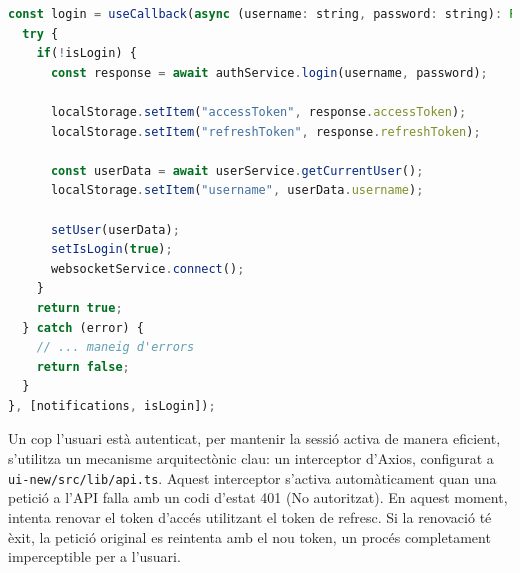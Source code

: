 \begin{lstlisting}[language=javascript, caption={Fragment de la funció `login` al hook `userAuth.tsx`}]
const login = useCallback(async (username: string, password: string): Promise<boolean> => {
  try {
    if(!isLogin) {
      const response = await authService.login(username, password);
      
      localStorage.setItem("accessToken", response.accessToken);
      localStorage.setItem("refreshToken", response.refreshToken);
      
      const userData = await userService.getCurrentUser();
      localStorage.setItem("username", userData.username);

      setUser(userData);
      setIsLogin(true);
      websocketService.connect();
    }
    return true;
  } catch (error) {
    // ... maneig d'errors
    return false;
  }
}, [notifications, isLogin]);
\end{lstlisting}

Un cop l'usuari està autenticat, per mantenir la sessió activa de manera eficient, s'utilitza un mecanisme arquitectònic clau: un interceptor d'Axios, configurat a \texttt{ui-new/src/lib/api.ts}. Aquest interceptor s'activa automàticament quan una petició a l'API falla amb un codi d'estat 401 (No autoritzat). En aquest moment, intenta renovar el token d'accés utilitzant el token de refresc. Si la renovació té èxit, la petició original es reintenta amb el nou token, un procés completament imperceptible per a l'usuari.

